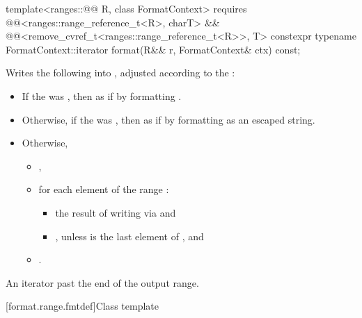 %
\begin{itemdecl}
template<ranges::@@ R, class FormatContext>
  requires @@<ranges::range_reference_t<R>, charT> &&
           @@<remove_cvref_t<ranges::range_reference_t<R>>, T>
  constexpr typename FormatContext::iterator
    format(R&& r, FormatContext& ctx) const;
\end{itemdecl}

\begin{itemdescr}
\pnum
\effects
Writes the following into ,
adjusted according to the :

\begin{itemize}
\item
If the  was ,
then as if by formatting .
\item
Otherwise, if the  was ,
then as if by formatting 
as an escaped string.
\item
Otherwise,
\begin{itemize}
\item
{},
\item
for each element  of the range :
\begin{itemize}
\item
the result of writing  via  and
\item
{}, unless  is the last element of , and
\end{itemize}
\item
{}.
\end{itemize}
\end{itemize}

\pnum
\returns
An iterator past the end of the output range.
\end{itemdescr}

[format.range.fmtdef]{Class template }

